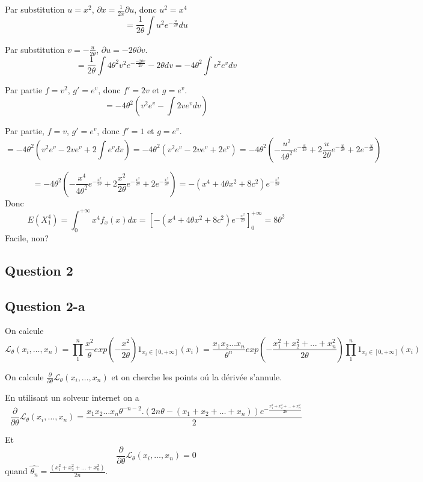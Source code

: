 \documentclass[]{book}
\theoremstyle{definition}
\begin{document}
Par substitution $u=x^2$, $\partial x = \frac{1}{2x}\partial u$, donc $u^2 = x^4$
$$
= \frac{1}{2\theta} \int u^2e^{-\frac{u}{2\theta}}  du
$$

Par substitution $v = -\frac{u}{2\theta}$, $\partial u = -{2\theta} \partial v$.
$$
= \frac{1}{2\theta} \int 4\theta^2 v^2 e^{-\frac{-2\theta v}{2\theta}}  -{2\theta} dv = -4\theta^2 \int v^2 e^{v} dv
$$

Par partie $f=v^2$, $g'=e^v$, donc $f'=2v$ et $g=e^v$.
$$
= -4\theta^2 \left(v^2e^{v} - \int 2ve^v dv \right)
$$

Par partie, $f=v$, $g'=e^v$, donc $f'=1$ et $g=e^v$.
$$
= -4\theta^2 \left(v^2e^{v} - 2ve^v + 2\int e^v dv \right) 
= -4\theta^2 \left(v^2e^{v} - 2ve^v + 2e^v  \right) 
= -4\theta^2 \left(-\frac{u^2}{4\theta^2} e^{-\frac{u}{2\theta}} + 2 \frac{u}{2\theta} e^{-\frac{u}{2\theta}} + 2 e^{-\frac{u}{2\theta}} \right)
$$

$$
= -4\theta^2 \left(-\frac{x^4}{4\theta^2} e^{-\frac{x^2}{2\theta}} + 2 \frac{x^2}{2\theta} e^{-\frac{x^2}{2\theta}} + 2 e^{-\frac{x^2}{2\theta}} \right) = -(x^4 + 4\theta x^2 +8c^2) e^{-\frac{x^2}{2\theta}}
$$
Donc 
$$
E(X_1^4) = \int_{0}^{+\infty} x^4 f_{x}(x) dx = \left[ -(x^4 + 4\theta x^2 +8c^2) e^{-\frac{x^2}{2\theta}} \right]_{0}^{+\infty} = 8\theta^2
$$
Facile, non?



\subsection*{Question 2}
\subsection*{Question 2-a}
On calcule
$$
\mathcal{L}_{\theta}(x_i,\ldots,x_n) = 
\prod_{1}^{n}\frac{x^2}{\theta} exp \left( -\frac{x^2}{2\theta}\right) 1_{x_i \in [0,+\infty]}(x_i) =
\frac{x_1x_2 \ldots x_n}{\theta^n} exp \left( -\frac{x_1^2+x_2^2+ \ldots +x_n^2 }{2\theta} \right) \prod_{1}^{n}{1_{x_i \in [0,+\infty]}(x_i)}
$$

On calcule $\frac{\partial}{\partial \theta} \mathcal{L}_{\theta}(x_i,\ldots,x_n)$ et on cherche  les points o\'u la d\'eriv\'ee s'annule. 

En utilisant un solveur internet on a 
$$
\frac{\partial}{\partial \theta} \mathcal{L}_{\theta}(x_i,\ldots,x_n) = \frac{x_1 x_2 \ldots x_n \theta^{-n-2}.(2n\theta - (x_1+x_2+\ldots + x_n)) e^{-\frac{x_1^2+x_2^2+ \ldots + x_n^2}{2\theta}}} {2}
$$

Et
$$
\frac{\partial}{\partial \theta} \mathcal{L}_{\theta}(x_i,\ldots,x_n) = 0
$$
quand $\hat{\theta_n} = \frac{(x_1^2+x_2^2+\ldots + x_n^2)}{2n}$.
\end{document}
